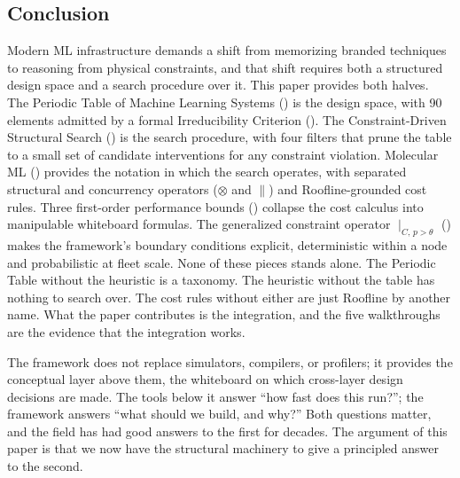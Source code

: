\documentclass[10pt,twocolumn]{article}
\begin{document}
\subsection{Conclusion}

Modern ML infrastructure demands a shift from memorizing branded techniques to reasoning from physical constraints, and that shift requires both a structured design space and a search procedure over it. This paper provides both halves. The Periodic Table of Machine Learning Systems () is the design space, with 90 elements admitted by a formal Irreducibility Criterion (). The Constraint-Driven Structural Search () is the search procedure, with four filters that prune the table to a small set of candidate interventions for any constraint violation. Molecular ML () provides the notation in which the search operates, with separated structural and concurrency operators ($\otimes$ and $\parallel$) and Roofline-grounded cost rules. Three first-order performance bounds () collapse the cost calculus into manipulable whiteboard formulas. The generalized constraint operator $\mid_{C,\, p > \theta}$ () makes the framework's boundary conditions explicit, deterministic within a node and probabilistic at fleet scale. None of these pieces stands alone. The Periodic Table without the heuristic is a taxonomy. The heuristic without the table has nothing to search over. The cost rules without either are just Roofline by another name. What the paper contributes is the integration, and the five walkthroughs are the evidence that the integration works.

The framework does not replace simulators, compilers, or profilers; it provides the conceptual layer above them, the whiteboard on which cross-layer design decisions are made. The tools below it answer ``how fast does this run?''; the framework answers ``what should we build, and why?'' Both questions matter, and the field has had good answers to the first for decades. The argument of this paper is that we now have the structural machinery to give a principled answer to the second.

\balance




\end{document}
